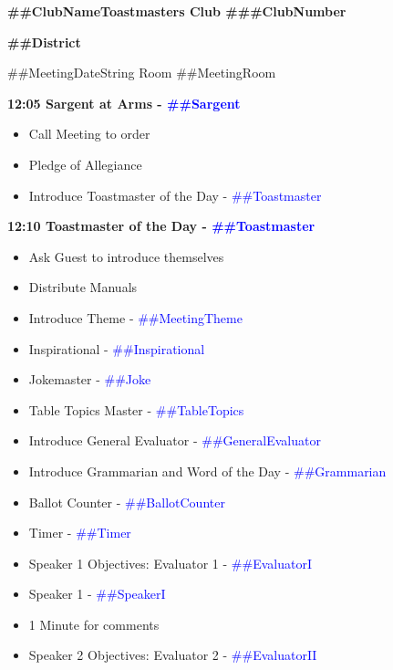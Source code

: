 \documentclass{article}
\newcommand{\clubName}{##ClubName}
\newcommand{\clubNumber}{##ClubNumber}
\newcommand{\district}{##District}
\newcommand{\meetingRoom}{##MeetingRoom}
\newcommand{\meetingTheme}{##MeetingTheme}
\newcommand{\meetingDateString}{##MeetingDateString}
\newcommand{\toastmaster}{##Toastmaster}
\newcommand{\sargent}{##Sargent}
\newcommand{\tableTopics}{##TableTopics}
\newcommand{\generalEvaluator}{##GeneralEvaluator}
\newcommand{\evaluatorI}{##EvaluatorI}
\newcommand{\evaluatorII}{##EvaluatorII}
\newcommand{\speakerI}{##SpeakerI}
\newcommand{\grammarian}{##Grammarian}
\newcommand{\timer}{##Timer}
\newcommand{\inspirational}{##Inspirational}
\newcommand{\ballotCounter}{##BallotCounter}
\newcommand{\joke}{##Joke}
\newcommand{\speechITitle}{##SpeechITitle}
\newcommand{\speechIProject}{##SpeechIProject}
\newcommand{\speechITimeConstraints}{##SpeechITimeConstraints}
\begin{document}
  \begin{spacing}{.8}
  \begin{center}
    {\bf \clubName Toastmasters Club \#\clubNumber}
    
	{\bf \district}
    
	\meetingDateString{} Room \meetingRoom 
  \end{center}
  {\Large \bf12:05 Sargent at Arms - \textcolor{blue}{\sargent{}}}
  \begin{itemize}
    \item Call Meeting to order
    \item Pledge of Allegiance
    \item Introduce Toastmaster of the Day - \textcolor{blue}{\toastmaster{}}
  \end{itemize}
  {\Large \bf12:10 Toastmaster of the Day - \textcolor{blue}{\toastmaster{}}} 
  \begin{itemize}
    \item Ask Guest to introduce themselves
    \item Distribute Manuals
    \item Introduce Theme - \textcolor{blue}{\meetingTheme{}}
    \item Inspirational - \textcolor{blue}{\inspirational{}}
    \item Jokemaster - \textcolor{blue}{\joke{}}
	\item Table Topics Master - \textcolor{blue}{\tableTopics{}}
    \item Introduce General Evaluator - \textcolor{blue}{\generalEvaluator{}}
	\item Introduce Grammarian and Word of the Day - \textcolor{blue}{\grammarian{}}
    \item Ballot Counter - \textcolor{blue}{\ballotCounter{}}
    \item Timer - \textcolor{blue}{\timer{}}
    \item Speaker 1 Objectives: Evaluator 1 - \textcolor{blue}{\evaluatorI{}}
    \item Speaker 1 - \textcolor{blue}{\speakerI{}}
    \item 1 Minute for comments
    \item Speaker 2 Objectives: Evaluator 2 - \textcolor{blue}{\evaluatorII{}}

\end{itemize}
\end{spacing}
\end{document}
